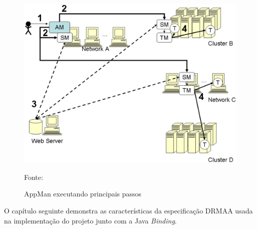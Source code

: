 \begin{figure}[htb]
\begin{center}
\includegraphics[scale=0.13]{./img/AppMan.eps}
\caption{AppMan executando principais passos}
\label{fig:AppMan}
Fonte: \cite{appman}
\end{center}
\end{figure}

O capítulo seguinte demonstra as características da especificação DRMAA usada na implementação do projeto junto com a Java \emph{Binding}.